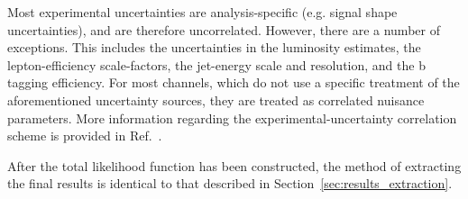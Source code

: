 Most experimental uncertainties are analysis-specific (e.g. \mgg signal shape uncertainties), and are therefore uncorrelated. However, there are a number of exceptions. This includes the uncertainties in the luminosity estimates, the lepton-efficiency scale-factors, the jet-energy scale and resolution, and the b tagging efficiency. For most channels, which do not use a specific treatment of the aforementioned uncertainty sources, they are treated as correlated nuisance parameters. More information regarding the experimental-uncertainty correlation scheme is provided in Ref.~\cite{CMS-PAS-HIG-19-005}.

After the total likelihood function has been constructed, the method of extracting the final results is identical to that described in Section~\ref{sec:results_extraction}.



